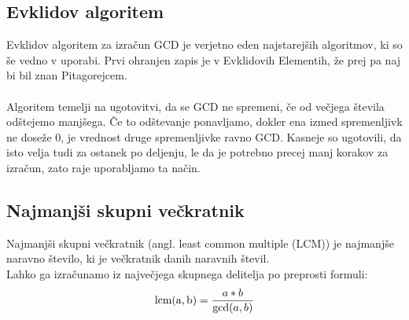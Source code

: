 \documentclass[10pt,a4paper,oneside]{book}
\begin{document}
\subsection{Evklidov algoritem}
Evklidov algoritem za izračun GCD je verjetno eden najstarejših algoritmov, ki so še vedno v uporabi. Prvi ohranjen zapis je v Evklidovih Elementih\cite{elementi}, že prej pa naj bi bil znan Pitagorejcem. \\
\\
Algoritem temelji na ugotovitvi, da se GCD ne spremeni, če od večjega števila odštejemo manjšega. Če to odštevanje ponavljamo, dokler ena izmed spremenljivk ne doseže 0, je vrednost druge spremenljivke ravno GCD. Kasneje so ugotovili, da isto velja tudi za ostanek po deljenju, le da je potrebno precej manj korakov za izračun, zato raje uporabljamo ta način.


\subsection{Najmanjši skupni večkratnik}
Najmanjši skupni večkratnik (angl. least common multiple (LCM)) je najmanjše naravno število, ki je večkratnik danih naravnih števil.\\
Lahko ga izračunamo iz največjega skupnega delitelja po preprosti formuli:
\[ \operatorname{lcm(a,b)}={a*b \over \operatorname{gcd}(a,b)}\]
%

\end{document}
